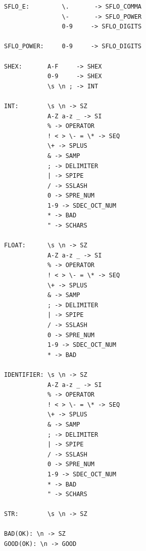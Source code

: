 \documentclass[14pt]{extarticle}
\begin{document}
\begin{lstlisting}
SFLO_E:         \.       -> SFLO_COMMA
                \-       -> SFLO_POWER 
                0-9     -> SFLO_DIGITS

SFLO_POWER:     0-9     -> SFLO_DIGITS
    
SHEX:       A-F     -> SHEX
            0-9     -> SHEX
            \s \n ; -> INT

INT:        \s \n -> SZ
            A-Z a-z _ -> SI
            % -> OPERATOR
            ! < > \- = \* -> SEQ
            \+ -> SPLUS
            & -> SAMP
            ; -> DELIMITER
            | -> SPIPE
            / -> SSLASH
            0 -> SPRE_NUM
            1-9 -> SDEC_OCT_NUM
            * -> BAD
            " -> SCHARS

FLOAT:      \s \n -> SZ
            A-Z a-z _ -> SI
            % -> OPERATOR
            ! < > \- = \* -> SEQ
            \+ -> SPLUS
            & -> SAMP
            ; -> DELIMITER
            | -> SPIPE
            / -> SSLASH
            0 -> SPRE_NUM
            1-9 -> SDEC_OCT_NUM
            * -> BAD
    
IDENTIFIER: \s \n -> SZ
            A-Z a-z _ -> SI
            % -> OPERATOR
            ! < > \- = \* -> SEQ
            \+ -> SPLUS
            & -> SAMP
            ; -> DELIMITER
            | -> SPIPE
            / -> SSLASH
            0 -> SPRE_NUM
            1-9 -> SDEC_OCT_NUM
            * -> BAD
            " -> SCHARS

STR:        \s \n -> SZ
    
BAD(OK): \n -> SZ
GOOD(OK): \n -> GOOD
    \end{lstlisting}
\end{document}
